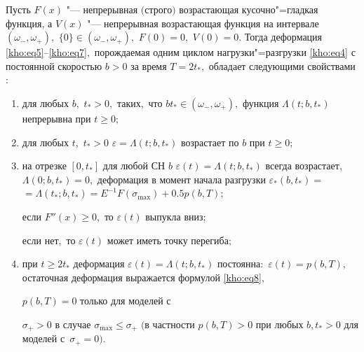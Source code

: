 \hypertarget{kh:th4}{} 



\begin{theorem}[4] Пусть $F(x)$ "--- непрерывная $($строго$)$ возрастающая кусочно"=гладкая функция, а $V(x)$ "--- непрерывная возрастающая функция на интервале $(\omega_{-},\omega_{+}),$ $\{0\}\in(\omega_{-},\omega_{+}),$ $F(0)=0,$ $V(0)=0.$ Тогда деформация \eqref{kho:eq5}--\eqref{kho:eq7}$,$ порождаемая одним циклом нагрузки"=разгрузки \eqref{kho:eq4} с постоянной скоростью $b>0$ за время $T=2t_\ast,$ обладает следующими свойствами\/$:$



\begin{enumerate}

\item[\rm 1)] для любых $b,$ $t_\ast>0,$ таких$,$ что $bt_\ast\in(\omega_{-},\omega_{+}),$ функция $\Lambda(t;b,t_\ast)$ непрерывна при $t\ge0;$



\item[\rm 2)] для любых $t,$ $t_\ast>0$ $\varepsilon=\Lambda(t;b,t_\ast)$ возрастает по $b$ при $t\ge 0;$



\item[\rm 3)] на отрезке $[0,t_\ast]$ для любой СН $b$ $\varepsilon(t)=\Lambda(t;b,t_\ast)$ всегда возрастает$,$ $\Lambda(0;b,t_\ast)=0,$ деформация в момент начала разгрузки $\varepsilon_\ast(b,t_\ast)=$  \linebreak $=\Lambda(t_\ast;b,t_\ast)=E^{-1}F(\sigma_{\max})+0.5p(b,T);$ 

если $F''(x)\ge0,$ то $\varepsilon(t)$ выпукла вниз$;$ 

если нет$,$ то $\varepsilon(t)$ может иметь точку перегиба\/$;$



\item[\rm 4)] при $t\ge2t_\ast$ деформация $\varepsilon(t)=\Lambda(t;b,t_\ast)$ постоянна\/$:$ $\varepsilon(t)=p(b,T),$ остаточная деформация выражается формулой \eqref{kho:eq8}$,$ 

$p(b,T)=0$ только для моделей с %

$\sigma_{+}>0$ в случае $\sigma_{\max}\le\sigma_{+}$ $($в частности $p(b,T)>0$ при любых $b,t_\ast>0$ для моделей с~$\sigma_{+}=0).$




\end{enumerate}
\end{theorem}
